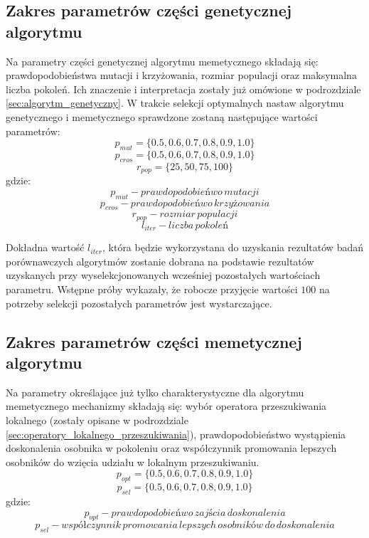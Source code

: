 \subsection{Zakres parametrów części genetycznej algorytmu}
%
Na parametry części genetycznej algorytmu memetycznego składają się: prawdopodobieństwa mutacji i krzyżowania, rozmiar populacji oraz maksymalna liczba pokoleń. Ich znaczenie i interpretacja zostały już omówione w podrozdziale \ref{sec:algorytm_genetyczny}. W trakcie selekcji optymalnych nastaw algorytmu genetycznego i memetycznego sprawdzone zostaną następujące wartości parametrów:
\[p_{mut} = \lbrace0.5, 0.6, 0.7, 0.8, 0.9, 1.0\rbrace\]
\[p_{cros} = \lbrace0.5, 0.6, 0.7, 0.8, 0.9, 1.0\rbrace\]
\[r_{pop}=\lbrace25, 50, 75, 100\rbrace\]
gdzie:
\[p_{mut} - prawdopodobieńwo\, mutacji\]
\[p_{cros} - prawdopodobieńwo\, krzyżowania\]
\[r_{pop} - rozmiar\, populacji\]
\[l_{iter} - liczba\, pokoleń\]

Dokładna wartość $l_{iter}$, która będzie wykorzystana do uzyskania rezultatów badań porównawczych algorytmów zostanie dobrana na podstawie rezultatów uzyskanych przy wyselekcjonowanych wcześniej pozostałych wartościach parametru. Wstępne próby wykazały, że robocze przyjęcie wartości $100$ na potrzeby selekcji pozostałych parametrów jest wystarczające.




\subsection{Zakres parametrów części memetycznej algorytmu}
Na parametry określające już tylko charakterystyczne dla algorytmu memetycznego mechanizmy składają się: wybór operatora przeszukiwania lokalnego (zostały opisane w podrozdziale \ref{sec:operatory_lokalnego_przeszukiwania}), prawdopodobieństwo wystąpienia doskonalenia osobnika w pokoleniu oraz współczynnik promowania lepszych osobników do wzięcia udziału w lokalnym przeszukiwaniu. 
\[p_{opt} = \lbrace0.5, 0.6, 0.7, 0.8, 0.9, 1.0\rbrace\]
\[p_{sel} = \lbrace0.5, 0.6, 0.7, 0.8, 0.9, 1.0\rbrace\]
gdzie:
\[p_{opt} - prawdopodobieńwo\,zajścia\, doskonalenia\]
\[p_{sel} - współczynnik\, promowania\, lepszych\, osobników\, do\, doskonalenia\]

